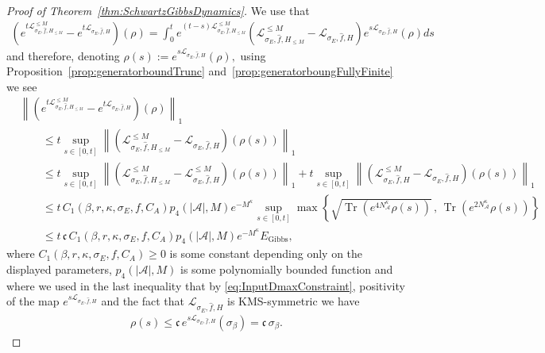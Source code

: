 \documentclass[11pt]{amsart}
\newcommand{\1}{\mathbbm{1}}
\newcommand{\Tr}{\operatorname{Tr}}
\newcommand{\cL}{\mathcal{L}}
\newcommand{\NA}{N_{\mathcal{A}}}
\newcommand{\cA}{\mathcal{A}}
\theoremstyle{plain}
\theoremstyle{definition}
\theoremstyle{remark}
\numberwithin{equation}{section}
\begin{document}
\begin{proof}[Proof of Theorem~\ref{thm:SchwartzGibbsDynamics}]
We use that 
\begin{align*}
    \left(e^{t\cL^{\le M}_{\sigma_E,\widehat f,H_{\le M}}} -e^{t\cL_{\sigma_E,\widehat f,H}}\right)(\rho) = \int_0^t e^{(t-s)\cL^{\le M}_{\sigma_E,\widehat f,H_{\le M}}}\left(\cL^{\le M}_{\sigma_E,\widehat f,H_{\le M}} -\cL_{\sigma_E,\widehat f,H}\right)e^{s\cL_{\sigma_E,\widehat f,H}}(\rho)ds
\end{align*}
and therefore, denoting $\rho(s) :=e^{s\cL_{\sigma_E,\widehat f,H}}(\rho),$ using Proposition~\ref{prop:generatorboundTrunc} and~\ref{prop:generatorboungFullyFinite} we see
\begin{align*}
    &\left\|\left(e^{t\cL^{\le M}_{\sigma_E,\widehat f,H_{\le M}}} -e^{t\cL_{\sigma_E,\widehat f,H}}\right)(\rho)\right\|_1 \\
    & \qquad \le   t\sup_{s\in[0,t]}\left\|\left(\cL^{\le M}_{\sigma_E,\widehat f,H_{\le M}}-\cL_{\sigma_E,\widehat f,H}\right)(\rho(s))\right\|_1 \\
 &    \qquad\le t\sup_{s\in[0,t]}\left\|\left(\cL^{\le M}_{\sigma_E,\widehat f,H_{\le M}}-\cL^{\le M}_{\sigma_E,\widehat f,H}\right)(\rho(s))\right\|_1 +t\sup_{s\in[0,t]}\left\|\left(\cL^{\le M}_{\sigma_E,\widehat f,H}-\cL_{\sigma_E,\widehat f,H}\right)(\rho(s))\right\|_1\\
    &\qquad \le t\,C_1(\beta,r,\kappa,\sigma_E,f,C_A) p_4(|\cA|,M)e^{-M^\kappa} \sup_{s\in[0,t]}\max\left\{\sqrt{\Tr\left(e^{4\NA^\kappa}\rho(s)\right)}\,,\, \Tr\left(e^{2\NA^\kappa}\rho(s)\right) \right\}\\
   &  \qquad\le t\,\mathfrak{c}\,C_1(\beta,r,\kappa,\sigma_E,f,C_A) p_4(|\mathcal{A}|,M) e^{-M^\kappa} E_{\operatorname{Gibbs}},
\end{align*}
where $C_1(\beta,r,\kappa,\sigma_E,f,C_A)\ge 0$ is some constant depending only on the displayed parameters, $p_4(|\mathcal{A}|,M)$ is some polynomially bounded function and where we used in the last inequality that by \eqref{eq:InputDmaxConstraint}, positivity of the map $e^{s\cL_{\sigma_E,\widehat f,H}}$ and the fact that $\cL_{\sigma_E,\widehat f,H}$ is KMS-symmetric we have
\begin{align*}
   \rho(s) \le \mathfrak{c}\, e^{s\cL_{\sigma_E,\widehat f,H}}(\sigma_\beta ) = \mathfrak{c}\,\sigma_\beta. 
\end{align*}
\end{proof}
\end{document}
